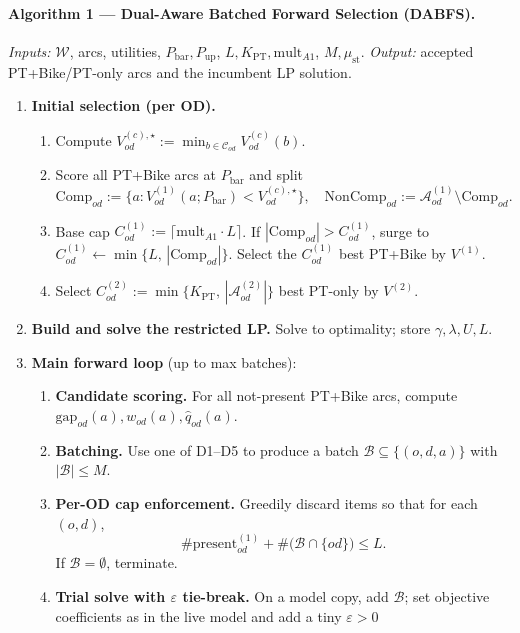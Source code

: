 \documentclass[11pt,a4paper]{article}
\begin{document}
\paragraph{Algorithm 1 — Dual-Aware Batched Forward Selection (DABFS).}
\emph{Inputs:} $\mathcal{W}$, arcs, utilities, $P_{\mathrm{bar}},P_{\mathrm{up}}$, $L,K_{\mathrm{PT}},\mathrm{mult}_{A1}$, $M,\mu_{\mathrm{st}}$.
\emph{Output:} accepted PT+Bike/PT-only arcs and the incumbent LP solution.
\begin{enumerate}
\item \textbf{Initial selection (per OD).}
  \begin{enumerate}
  \item Compute $V^{(c),\star}_{od}:=\min_{b\in\mathcal{C}_{od}} V^{(c)}_{od}(b)$.
  \item Score all PT+Bike arcs at $P_{\mathrm{bar}}$ and split
  \[
    \mathrm{Comp}_{od}:=\{a: V^{(1)}_{od}(a;P_{\mathrm{bar}}) < V^{(c),\star}_{od}\},\quad
    \mathrm{NonComp}_{od}:=\mathcal{A}^{(1)}_{od}\setminus\mathrm{Comp}_{od}.
  \]
  \item Base cap $C^{(1)}_{od}:=\lceil \mathrm{mult}_{A1}\cdot L\rceil$. If $|\mathrm{Comp}_{od}|>C^{(1)}_{od}$,
  surge to $C^{(1)}_{od}\leftarrow \min\{L,\,|\mathrm{Comp}_{od}|\}$.
  Select the $C^{(1)}_{od}$ best PT+Bike by $V^{(1)}$.
  \item Select $C^{(2)}_{od}:=\min\{K_{\mathrm{PT}},\,|\mathcal{A}^{(2)}_{od}|\}$ best PT-only by $V^{(2)}$.
  \end{enumerate}
\item \textbf{Build and solve the restricted LP.} Solve to optimality; store $\gamma,\lambda,U,L$.
\item \textbf{Main forward loop} (up to max batches):
  \begin{enumerate}
  \item \textbf{Candidate scoring.} For all not-present PT+Bike arcs, compute $\mathrm{gap}_{od}(a),w_{od}(a),\widehat q_{od}(a)$.
  \item \textbf{Batching.} Use one of D1–D5 to produce a batch $\mathcal{B}\subseteq\{(o,d,a)\}$ with $|\mathcal{B}|\le M$.
  \item \textbf{Per-OD cap enforcement.} Greedily discard items so that for each $(o,d)$,
  \[
  \#\mathrm{present}^{(1)}_{od} + \#\bigl(\mathcal{B}\cap\{od\}\bigr) \le L.
  \]
  If $\mathcal{B}=\emptyset$, terminate.
  \item \textbf{Trial solve with $\varepsilon$ tie-break.}
  On a model copy, add $\mathcal{B}$; set objective coefficients as in the live model and add a tiny $\varepsilon>0$

\end{enumerate}
\end{enumerate}
\end{document}
